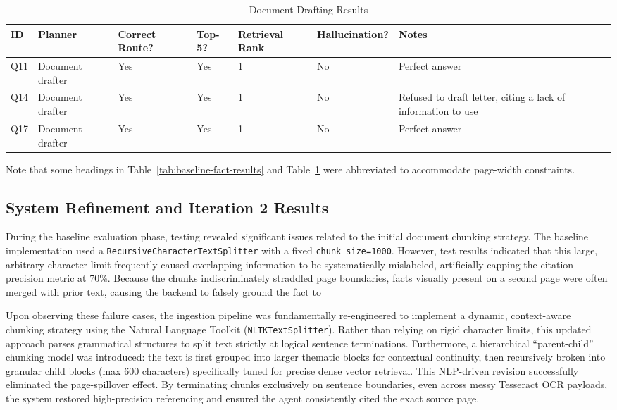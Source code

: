 \documentclass[11pt,a4paper]{article}
\begin{document}
    \begin{table}[H]
    \centering
    \begin{tabularx}{\textwidth}{|l|l|X|X|X|X|X|}
    \hline
        ID & Planner & Correct Route? & Top-5? & Retrie\-val Rank & Hal\-lu\-ci\-na\-tion? & Notes \\ \hline
        Q11 & Document drafter & Yes & Yes & 1 & No & Perfect answer \\ \hline
        Q14 & Document drafter & Yes & Yes & 1 & No & Refused to draft letter, citing a lack of information to use \\ \hline
        Q17 & Document drafter & Yes & Yes & 1 & No & Perfect answer \\ \hline
    \end{tabularx}

    \caption{Document Drafting Results}
    \label{tab:baseline-drafting-results}
\end{table}

Note that some headings in Table~\ref{tab:baseline-fact-results} and Table~\ref{tab:baseline-drafting-results} were abbreviated to accommodate page-width constraints.

\subsection{System Refinement and Iteration 2 Results}

During the baseline evaluation phase, testing revealed significant issues related to the initial document chunking strategy. The baseline implementation used a \texttt{RecursiveCharacterTextSplitter} with a fixed \texttt{chunk\_size=1000}. However, test results indicated that this large, arbitrary character limit frequently caused overlapping information to be systematically mislabeled, artificially capping the citation precision metric at 70\%. Because the chunks indiscriminately straddled page boundaries, facts visually present on a second page were often merged with prior text, causing the backend to falsely ground the fact to 

Upon observing these failure cases, the ingestion pipeline was fundamentally re-engineered to implement a dynamic, context-aware chunking strategy using the Natural Language Toolkit (\texttt{NLTKTextSplitter}). Rather than relying on rigid character limits, this updated approach parses grammatical structures to split text strictly at logical sentence terminations. Furthermore, a hierarchical ``parent-child'' chunking model was introduced: the text is first grouped into larger thematic blocks for contextual continuity, then recursively broken into granular child blocks (max 600 characters) specifically tuned for precise dense vector retrieval. This NLP-driven revision successfully eliminated the page-spillover effect. By terminating chunks exclusively on sentence boundaries, even across messy Tesseract OCR payloads, the system restored high-precision referencing and ensured the agent consistently cited the exact source page.
\end{document}
